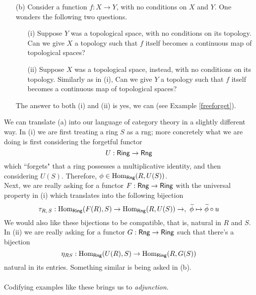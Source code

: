 \begin{discussion}[Optimisation]
\begin{itemize}
\item[(b)] Consider a function $f: X \to Y$, with no conditions on $X$ and $Y$. One wonders the following two questions.
\begin{itemize}
\item[(i)] Suppose $Y$ was a topological space, with no conditions on its topology. Can we give $X$ a topology such that $f$ itself becomes a continuous map of topological spaces?
\item[(ii)] Suppose $X$ was a topological space, instead, with no conditions on its topology. Similarly as in (i), Can we give $Y$ a topology such that $f$ itself becomes a continuous map of topological spaces?
\end{itemize}
The answer to both (i) and (ii) is yes, we can (see Example \ref{freeforget}).
\end{itemize}
We can translate (a) into our language of category theory in a slightly different way. In (i) we are first treating a ring $S$ as a rng; more concretely what we are doing is first considering the forgetful functor
\[U: \mathsf{Ring} \to \mathsf{Rng}\]
which ``forgets" that a ring possesses a multiplicative identity, and then considering $U(S)$. Therefore, $\phi \in \mathrm{Hom}_{\mathsf{Rng}}(R,U(S))$.\\[1em]
Next, we are really asking for a functor $F: \mathsf{Rng} \to \mathsf{Ring}$ with the universal property in (i) which translates into the following bijection
\[\tau_{R,\,S}:\mathrm{Hom}_{\mathsf{Ring}}(F(R),S) \to \mathrm{Hom}_{\mathsf{Rng}}(R,U(S)) \to ,\ \widetilde{\phi} \mapsto \widetilde{\phi}\circ u\]
We would also like these bijections to be compatible, that is, natural in $R$ and $S$.\\[1em]
In (ii) we are really asking for a functor $G: \mathsf{Rng} \to \mathsf{Ring}$ such that there's a bijection
\[\eta_{RS}:\mathrm{Hom}_{\mathsf{Rng}}(U(R),S) \to \mathrm{Hom}_{\mathsf{Ring}}(R,G(S))\]
natural in its entries. Something similar is being asked in (b).\\
\\
Codifying examples like these brings us to \emph{adjunction}.
\end{discussion}

\vspace*{0.1in}

